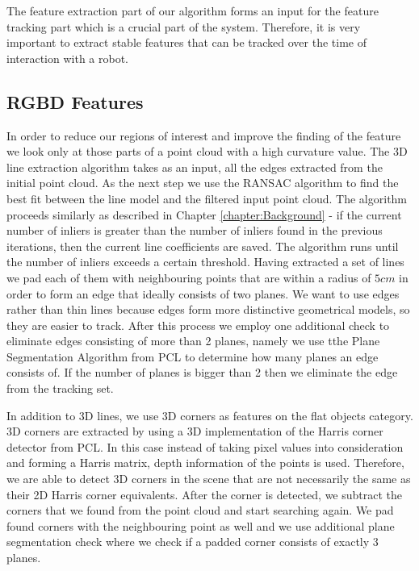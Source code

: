 The feature extraction part of our algorithm forms an input for the feature tracking part which is a crucial part of the system. Therefore, it is very important to extract stable features that can be tracked over the time of interaction with a robot.




\subsection{RGBD Features}
\label{sec:3dfeatures}
In order to reduce our regions of interest and improve the finding of the feature we look only at those parts of a point cloud with a high curvature value. The 3D line extraction algorithm takes as an input, all the edges extracted from the initial point cloud. As the next step we use the RANSAC algorithm to find the best fit between the line model and the filtered input point cloud. The algorithm proceeds similarly as described in Chapter \ref{chapter:Background} - if the current number of inliers is greater than the number of inliers found in the previous iterations, then the current line coefficients are saved. The algorithm runs until the number of inliers exceeds a certain threshold. Having extracted a set of lines we pad each of them with neighbouring points that are within a radius of $5cm$ in order to form an edge that ideally consists of two planes. We want to use edges rather than thin lines because edges form more distinctive geometrical models, so they are easier to track. After this process we employ one additional check to eliminate edges consisting of more than 2 planes, namely we use tthe Plane Segmentation Algorithm from PCL to determine how many planes an edge consists of. If the number of planes is bigger than 2 then we eliminate the edge from the tracking set.

In addition to 3D lines, we use 3D corners as features on the flat objects category. 3D corners are extracted by using a 3D implementation of the Harris corner detector from PCL. In this case instead of taking pixel values into consideration and forming a Harris matrix, depth information of the points is used. Therefore, we are able to detect 3D corners in the scene that are not necessarily the same as their 2D Harris corner equivalents. After the corner is detected, we subtract the corners that we found from the point cloud and start searching again. We pad found corners with the neighbouring point as well and we use additional plane segmentation check where we check if a padded corner consists of exactly 3 planes.

